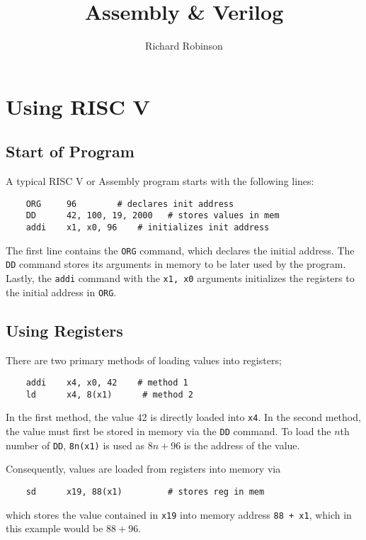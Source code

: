 \documentclass[oneside,11pt]{book}
\title{\Huge{\textbf{Assembly \& Verilog}}}
\author{Richard Robinson}
\begin{document}
\maketitle
\setlength{\parindent}{0pt}

\chapter{Using RISC V}

\section{Start of Program}

A typical RISC V or Assembly program starts with the following lines:
\begin{verbatim}
	ORG     96		  # declares init address
	DD      42, 100, 19, 2000   # stores values in mem
	addi    x1, x0, 96	  # initializes init address
\end{verbatim}
The first line contains the \verb$ORG$ command, which declares the initial address. The \verb$DD$ command stores its arguments in memory to be later used by the program. Lastly, the \verb$addi$ command with the \verb$x1, x0$ arguments initializes the registers to the initial address in \verb$ORG$.

\section{Using Registers}
There are two primary methods of loading values into registers;
\begin{verbatim}
	addi    x4, x0, 42	  # method 1
	ld      x4, 8(x1)	   # method 2
\end{verbatim}
In the first method, the value 42 is directly loaded into \verb|x4|. In the second method, the value must first be stored in memory via the \verb$DD$ command. To load the $n$th number of \verb$DD$, \verb$8n(x1)$ is used as $8n + 96$ is the address of the value.

\bigskip
Consequently, values are loaded from registers into memory via
\begin{verbatim}
	sd      x19, 88(x1)         # stores reg in mem
\end{verbatim}
which stores the value contained in \verb$x19$ into memory address \verb|88 + x1|, which in this example would be $88 + 96$.
\end{document}
